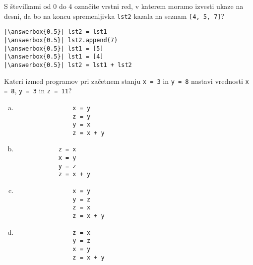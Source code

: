 \documentclass[arhiv, 10pt]{../izpit}
\newcommand{\inlinepy}[1]{\texttt{#1}}
\newcommand{\answerbox}[1]{\framebox{\vphantom{\large M}\hspace{#1cm}}}
\begin{document}
        \naloga*
        \begin{multicols}{2}
        \noindent 
        S številkami od $0$ do $4$ označite vrstni red, v katerem moramo izvesti ukaze na desni, da bo na koncu spremenljivka \inlinepy{lst2} kazala na seznam \inlinepy{[4, 5, 7]}?
    
        \columnbreak
        \noindent
        \begin{verbatim}
|\answerbox{0.5}| lst2 = lst1
|\answerbox{0.5}| lst2.append(7)
|\answerbox{0.5}| lst1 = [5]
|\answerbox{0.5}| lst1 = [4]
|\answerbox{0.5}| lst2 = lst1 + lst2

        \end{verbatim}
        \end{multicols}
    
            
        \naloga*
        
        Kateri izmed programov pri začetnem stanju
            \inlinepy{x = 3} in
            \inlinepy{y = 8}
        nastavi vrednosti
            \inlinepy{x = 8},
            \inlinepy{y = 3} in
            \inlinepy{z = 11}?
    
        \begin{multicols}{4}
        \begin{enumerate}[(a)]
\item 
                \begin{verbatim}
                x = y
                z = y
                y = x
                z = x + y
                \end{verbatim}
            
\item 
            \begin{verbatim}
            z = x
            x = y
            y = z
            z = x + y
            \end{verbatim}
        
\item 
                \begin{verbatim}
                x = y
                y = z
                z = x
                z = x + y
                \end{verbatim}
            
\item 
                \begin{verbatim}
                z = x
                y = z
                x = y
                z = x + y
                \end{verbatim}
            
\end{enumerate}

        \end{multicols}
    
\end{document}
